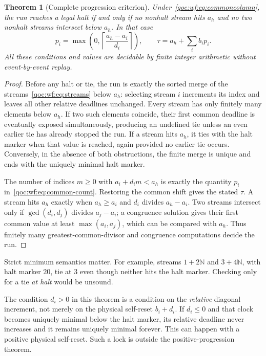 \documentclass[11pt,letterpaper]{article}
\newtheorem{theorem}{Theorem}[section]
\theoremstyle{definition}
\theoremstyle{remark}
\newcommand{\N}{\mathbb N}
\begin{document}
\begin{theorem}[Complete progression criterion]\label{qoc:wf:thm:common}
Under~\eqref{qoc:wf:eq:commoncolumn}, the run reaches a legal halt if and only if no nonhalt stream hits $a_h$ and no two nonhalt streams intersect below $a_h$. In that case
\begin{equation}\label{qoc:wf:eq:common-count}
 p_i=\max\left(0,\left\lceil\frac{a_h-a_i}{d_i}\right\rceil\right),
 \qquad \tau=a_h+\sum_i b_ip_i.
\end{equation}
All these conditions and values are decidable by finite integer arithmetic without event-by-event replay.
\end{theorem}
\begin{proof}
Before any halt or tie, the run is exactly the sorted merge of the streams~\eqref{qoc:wf:eq:streams} below $a_h$: selecting stream $i$ increments its index and leaves all other relative deadlines unchanged. Every stream has only finitely many elements below $a_h$. If two such elements coincide, their first common deadline is eventually exposed simultaneously, producing an undefined tie unless an even earlier tie has already stopped the run. If a stream hits $a_h$, it ties with the halt marker when that value is reached, again provided no earlier tie occurs. Conversely, in the absence of both obstructions, the finite merge is unique and ends with the uniquely minimal halt marker.

The number of indices $m\ge0$ with $a_i+d_im<a_h$ is exactly the quantity $p_i$ in~\eqref{qoc:wf:eq:common-count}. Restoring the common shift gives the stated $\tau$. A stream hits $a_h$ exactly when $a_h\ge a_i$ and $d_i$ divides $a_h-a_i$. Two streams intersect only if $\gcd(d_i,d_j)$ divides $a_j-a_i$; a congruence solution gives their first common value at least $\max(a_i,a_j)$, which can be compared with $a_h$. Thus finitely many greatest-common-divisor and congruence computations decide the run.
\end{proof}

Strict minimum semantics matter. For example, streams $1+2\N$ and $3+4\N$, with halt marker $20$, tie at $3$ even though neither hits the halt marker. Checking only for a tie \emph{at halt} would be unsound.

The condition $d_i>0$ in this theorem is a condition on the \emph{relative} diagonal increment, not merely on the physical self-reset $b_i+d_i$. If $d_i\le0$ and that clock becomes uniquely minimal below the halt marker, its relative deadline never increases and it remains uniquely minimal forever. This can happen with a positive physical self-reset. Such a lock is outside the positive-progression theorem.
\end{document}
